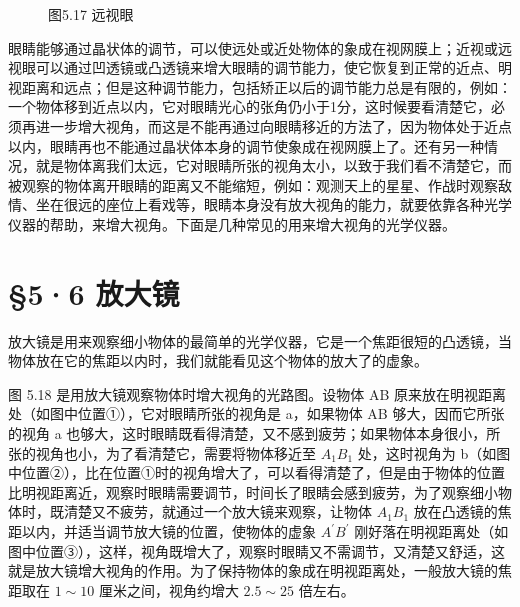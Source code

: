 \begin{figure}
{%
}
\caption{图5.17 远视眼}
\end{figure}

眼睛能够通过晶状体的调节，可以使远处或近处物体的象成在视网膜上；近视或远视眼可以通过凹透镜或凸透镜来增大眼睛的调节能力，使它恢复到正常的近点、明视距离和远点；但是这种调节能力，包括矫正以后的调节能力总是有限的，例如：一个物体移到近点以内，它对眼睛光心的张角仍小于1分，这时候要看清楚它，必须再进一步增大视角，而这是不能再通过向眼睛移近的方法了，因为物体处于近点以内，眼睛再也不能通过晶状体本身的调节使象成在视网膜上了。还有另一种情况，就是物体离我们太远，它对眼睛所张的视角太小，以致于我们看不清楚它，而被观察的物体离开眼睛的距离又不能缩短，例如：观测天上的星星、作战时观察敌情、坐在很远的座位上看戏等，眼睛本身没有放大视角的能力，就要依靠各种光学仪器的帮助，来增大视角。下面是几种常见的用来增大视角的光学仪器。

\section{§5·6 放大镜}

放大镜是用来观察细小物体的最简单的光学仪器，它是一个焦距很短的凸透镜，当物体放在它的焦距以内时，我们就能看见这个物体的放大了的虚象。

图 5.18 是用放大镜观察物体时增大视角的光路图。设物体 AB
原来放在明视距离处（如图中位置①），它对眼睛所张的视角是 a，如果物体 AB
够大，因而它所张的视角 a
也够大，这时眼睛既看得清楚，又不感到疲劳；如果物体本身很小，所张的视角也小，为了看清楚它，需要将物体移近至
\(A_{1}B_{1}\) 处，这时视角为
b（如图中位置②），比在位置①时的视角增大了，可以看得清楚了，但是由于物体的位置比明视距离近，观察时眼睛需要调节，时间长了眼睛会感到疲劳，为了观察细小物体时，既清楚又不疲劳，就通过一个放大镜来观察，让物体
\(A_{1}B_{1}\)
放在凸透镜的焦距以内，并适当调节放大镜的位置，使物体的虚象
\(A^{\prime}B^{\prime}\)
刚好落在明视距离处（如图中位置③），这样，视角既增大了，观察时眼睛又不需调节，又清楚又舒适，这就是放大镜增大视角的作用。为了保持物体的象成在明视距离处，一般放大镜的焦距取在
\(1 \sim 10\) 厘米之间，视角约增大 \(2.5 \sim 25\) 倍左右。

